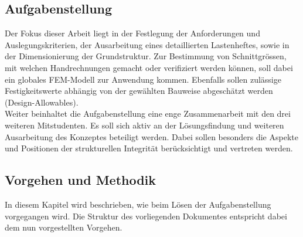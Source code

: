 \subsection{Aufgabenstellung}
\label{Aufgabenstellung}
Der Fokus dieser Arbeit liegt in der Festlegung der Anforderungen und Auslegungskriterien, der Ausarbeitung eines detaillierten Lastenheftes, sowie in der Dimensionierung der Grundstruktur. Zur Bestimmung von Schnittgrössen, mit welchen Handrechnungen gemacht oder verifiziert werden können, soll dabei ein globales FEM-Modell zur Anwendung kommen. Ebenfalls sollen zulässige Festigkeitswerte abhängig von der gewählten Bauweise abgeschätzt werden (Design-Allowables).\\
Weiter beinhaltet die Aufgabenstellung eine enge Zusammenarbeit mit den drei weiteren Mitstudenten. Es soll sich aktiv an der Lösungsfindung und weiteren Ausarbeitung des Konzeptes beteiligt werden. Dabei sollen besonders die Aspekte und Positionen der strukturellen Integrität berücksichtigt und vertreten werden.

\subsection{Vorgehen und Methodik}
In diesem Kapitel wird beschrieben, wie beim Lösen der Aufgabenstellung vorgegangen wird. Die Struktur des vorliegenden Dokumentes entspricht dabei dem nun vorgestellten Vorgehen.

